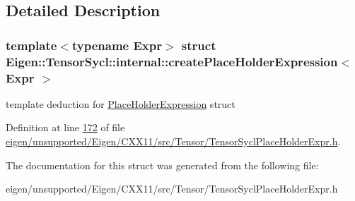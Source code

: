 \subsection{Detailed Description}
\subsubsection*{template$<$typename Expr$>$\newline
struct Eigen\+::\+Tensor\+Sycl\+::internal\+::create\+Place\+Holder\+Expression$<$ Expr $>$}

template deduction for \hyperlink{struct_eigen_1_1_tensor_sycl_1_1internal_1_1_place_holder_expression}{Place\+Holder\+Expression} struct 

Definition at line \hyperlink{eigen_2unsupported_2_eigen_2_c_x_x11_2src_2_tensor_2_tensor_sycl_place_holder_expr_8h_source_l00172}{172} of file \hyperlink{eigen_2unsupported_2_eigen_2_c_x_x11_2src_2_tensor_2_tensor_sycl_place_holder_expr_8h_source}{eigen/unsupported/\+Eigen/\+C\+X\+X11/src/\+Tensor/\+Tensor\+Sycl\+Place\+Holder\+Expr.\+h}.



The documentation for this struct was generated from the following file\+:\begin{DoxyCompactItemize}
\item 
eigen/unsupported/\+Eigen/\+C\+X\+X11/src/\+Tensor/\+Tensor\+Sycl\+Place\+Holder\+Expr.\+h\end{DoxyCompactItemize}
